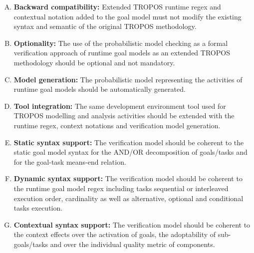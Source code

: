 \begin{enumerate}[R.1]

\item \textbf{Backward compatibility:} Extended TROPOS runtime regex and contextual notation added to the goal model must not modify the existing syntax and semantic of the original TROPOS methodology.

\item \textbf{Optionality:} The use of the probabilistic model checking as a formal verification approach of runtime goal models as an extended TROPOS methodology should be optional and not mandatory.
\medskip

\item \textbf{Model generation:} The probabilistic model representing the activities of runtime goal models should be automatically generated.
\medskip

\item \textbf{Tool integration:} The same development environment tool used for TROPOS modelling and analysis activities should be extended with the runtime regex, context notations and verification model generation.
\medskip

\item \textbf{Static syntax support:} The verification model should be coherent to the static goal model syntax for the AND/OR decomposition of goals/tasks and for the goal-task means-end relation.
\medskip

\item \textbf{Dynamic syntax support:} The verification model should be coherent to the runtime goal model regex including tasks sequential or interleaved execution order, cardinality as well as alternative, optional and conditional tasks execution.
\medskip

\item \textbf{Contextual syntax support:} The verification model should be coherent to the context effects over the activation of goals, the adoptability of sub-goals/tasks and over the individual quality metric of components. 

\end{enumerate}